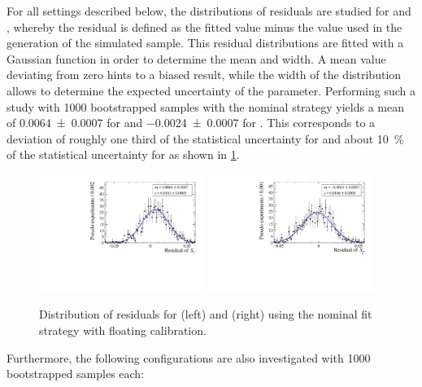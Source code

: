 For all settings described below, the distributions of residuals are studied for \Sf and \Sfbar, whereby the residual is defined as the fitted value minus the value used in the generation  of the simulated sample.
This residual distributions are fitted with a Gaussian function in order to determine the mean and width.
A mean value deviating from zero hints to a biased result, while the width of the distribution allows to determine the expected uncertainty of the parameter.
Performing such a study with \num{1000} bootstrapped samples with the nominal strategy yields a mean of \num{0.0064\pm0.0007} for \Sf and \num{-0.0024\pm0.0007} for \Sfbar.
This corresponds to a deviation of roughly one third of the statistical uncertainty for \Sf and about \SI{10}{\percent} of the statistical uncertainty for \Sfbar  as shown in \cref{fig:BootstrapStudy}.
\begin{figure}[tbp]
    \centering
    \includegraphics[width=0.48\textwidth]{10TimeFit/figs/S_f_res.pdf}
    \includegraphics[width=0.48\textwidth]{10TimeFit/figs/S_fbar_res.pdf}
    \caption{Distribution of residuals for \Sf (left) and \Sfbar (right) using the nominal fit strategy with floating calibration.}
    \label{fig:BootstrapStudy}
\end{figure}
Furthermore, the following configurations are also investigated with \num{1000} bootstrapped samples each:

\newpage

